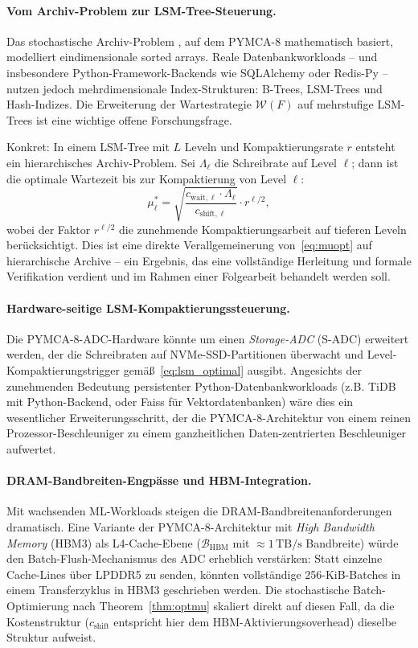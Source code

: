 ﻿\documentclass[a4paper,12pt]{scrreprt}
\theoremstyle{definition}
\begin{document}
	\paragraph{Vom Archiv-Problem zur LSM-Tree-Steuerung.}
	Das stochastische Archiv-Problem \cite{epp2026archiv}, auf dem PYMCA-8 mathematisch
	basiert, modelliert eindimensionale sorted arrays. Reale Datenbankworkloads --
	und insbesondere Python-Framework-Backends wie SQLAlchemy oder Redis-Py --
	nutzen jedoch mehrdimensionale Index-Strukturen: B-Trees, LSM-Trees und
	Hash-Indizes. Die Erweiterung der Wartestrategie $\mathcal{W}(F)$ auf
	mehrstufige LSM-Trees ist eine wichtige offene Forschungsfrage.

	Konkret: In einem LSM-Tree mit $L$ Leveln und Kompaktierungsrate $r$ entsteht
	ein hierarchisches Archiv-Problem. Sei $\Lambda_\ell$ die Schreibrate auf Level
	$\ell$; dann ist die optimale Wartezeit bis zur Kompaktierung von Level $\ell$:
	\begin{equation}
		\mu_\ell^* = \sqrt{\frac{c_{\mathrm{wait},\ell} \cdot \Lambda_\ell}{c_{\mathrm{shift},\ell}}}
		\cdot r^{\ell/2},
		\label{eq:lsm_optimal}
	\end{equation}
	wobei der Faktor $r^{\ell/2}$ die zunehmende Kompaktierungsarbeit auf tieferen
	Leveln berücksichtigt. Dies ist eine direkte Verallgemeinerung von~\eqref{eq:muopt}
	auf hierarchische Archive -- ein Ergebnis, das eine vollständige Herleitung und
	formale Verifikation verdient und im Rahmen einer Folgearbeit behandelt werden soll.

	\paragraph{Hardware-seitige LSM-Kompaktierungssteuerung.}
	Die PYMCA-8-ADC-Hardware könnte um einen \emph{Storage-ADC} (S-ADC) erweitert
	werden, der die Schreibraten auf NVMe-SSD-Partitionen überwacht und
	Level-Kompaktierungstrigger gemäß~\eqref{eq:lsm_optimal} ausgibt.
	Angesichts der zunehmenden Bedeutung persistenter Python-Datenbankworkloads
	(z.B. TiDB mit Python-Backend, oder Faiss für Vektordatenbanken) wäre dies
	ein wesentlicher Erweiterungsschritt, der die PYMCA-8-Architektur von einem
	reinen Prozessor-Beschleuniger zu einem ganzheitlichen Daten-zentrierten
	Beschleuniger aufwertet.

	\paragraph{DRAM-Band\-breiten-Engpässe und HBM-Integration.}
	Mit wachsenden ML-Work\-loads steigen die DRAM-Bandbreitenanforderungen dramatisch.
	Eine Variante der PYMCA-8-Architektur mit \emph{High Bandwidth Memory} (HBM3)
	als L4-Cache-Ebene ($\mathcal{B}_\text{HBM}$ mit $\approx 1\,\mathrm{TB/s}$
	Bandbreite) würde den Batch-Flush-Mechanismus des ADC erheblich verstärken:
	Statt einzelne Cache-Lines über LPDDR5 zu senden, könnten vollständige
	256-KiB-Batches in einem Transferzyklus in HBM3 geschrieben werden.
	Die stochastische Batch-Optimierung nach Theorem~\ref{thm:optmu} skaliert
	direkt auf diesen Fall, da die Kostenstruktur ($c_{\mathrm{shift}}$ entspricht
	hier dem HBM-Aktivierungsoverhead) dieselbe Struktur aufweist.
\end{document}
